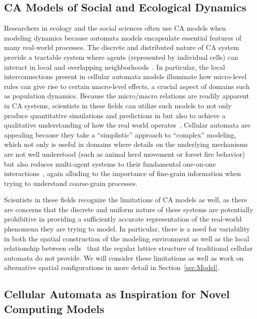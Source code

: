 \documentclass[a4paper,11pt,twoside]{report}
\begin{document}
\subsection{CA Models of Social and Ecological Dynamics}

Researchers in ecology and the social sciences often use CA models when modeling dynamics because automata models encapsulate essential features of many real-world processes. The discrete and distributed nature of CA system provide a tractable system where agents (represented by individual cells) can interact in local and overlapping neighborhoods~\cite{he98,bi07}. In particular, the local interconnections present in cellular automata models illuminate how micro-level rules can give rise to certain macro-level effects, a crucial aspect of domains such as population dynamics. Because the micro/macro relations are readily apparent in CA systems, scientists in these fields can utilize such models to not only produce quantitative simulations and predictions in but also to achieve a qualitative understanding of how the real world operates~\cite{he98}. Cellular automata are appealing because they take a ``simplistic'' approach to 
``complex'' modeling, which not only is useful in domains where details on the underlying mechanisms are not well understood (such as animal herd movement or forest fire behavior) but also reduces multi-agent systems to their fundamental one-on-one interactions~\cite{bi07,ca06}, again alluding to the importance of fine-grain information when trying to understand coarse-grain processes. 

Scientists in these fields recognize the limitations of CA models as well, as there are concerns that the discrete and uniform nature of these systems are potentially prohibitive in providing a sufficiently accurate representation of the real-world phenomena they are trying to model. In particular, there is a need for variability in both the spatial construction of the modeling environment as well as the local relationship between cells~\cite{fl01} that the regular lattice structure of traditional cellular automata do not provide. We will consider these limitations as well as work on alternative spatial configurations in more detail in Section~\ref{sec:Model}.

\subsection{Cellular Automata as Inspiration for Novel Computing Models}
\end{document}
